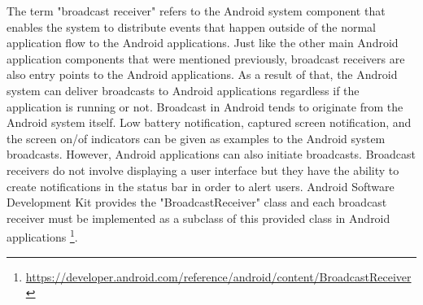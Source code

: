 The term "broadcast receiver" refers to the Android system component that enables the system to distribute events that happen outside of the normal application flow to the Android applications. Just like the other main Android application components that were mentioned previously, broadcast receivers are also entry points to the Android applications. As a result of that, the Android system can deliver broadcasts to Android applications regardless if the application is running or not. Broadcast in Android tends to originate from the Android system itself. Low battery notification, captured screen notification, and the screen on/of indicators can be given as examples to the Android system broadcasts. However, Android applications can also initiate broadcasts. Broadcast receivers do not involve displaying a user interface but they have the ability to create notifications in the status bar in order to alert users. Android Software Development Kit provides the "BroadcastReceiver" class and each broadcast receiver must be implemented as a subclass of this provided class in Android applications \footnote{\url{https://developer.android.com/reference/android/content/BroadcastReceiver}}.